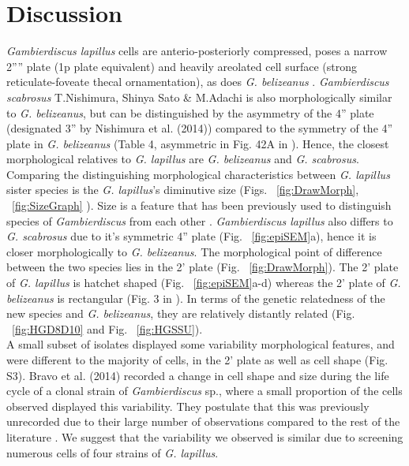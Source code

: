 \documentclass[12pt]{article}
\begin{document}
\newpage
\section{Discussion}
\emph{Gambierdiscus lapillus} cells are anterio-posteriorly compressed, poses a narrow 2'''' plate (1p plate equivalent) and heavily areolated cell surface (strong reticulate-foveate thecal ornamentation), as does \emph{G. belizeanus}  \citep{litaker2009taxonomy}.
 \emph{Gambierdiscus scabrosus} T.Nishimura, Shinya Sato \& M.Adachi is also morphologically similar to \emph{G. belizeanus}, but can be distinguished by the asymmetry of the 4'' plate (designated 3'' by Nishimura et al. (2014)) compared to the symmetry of the 4'' plate in \emph{G. belizeanus} (Table 4, asymmetric in Fig. 42A in \citep{hoppenrath2014marine}). 
 Hence, the closest morphological relatives to \emph{G. lapillus} are \emph{G. belizeanus} and \emph{G. scabrosus}. 
Comparing the distinguishing morphological characteristics between \emph{G. lapillus} sister species is the \textit{G. lapillus}'s diminutive size (Figs. ~\ref{fig:DrawMorph}, ~\ref{fig:SizeGraph} ).  
 Size is a feature that has been previously used to distinguish species of \emph{Gambierdiscus} from each other \citep{litaker2009taxonomy}. 
\emph{Gambierdiscus lapillus} also differs to \emph{G. scabrosus} due to it's symmetric 4'' plate (Fig. ~\ref{fig:epiSEM}a), hence it is closer morphologically to \emph{G. belizeanus}. 
The morphological point of difference between the two species lies in the 2' plate (Fig. ~\ref{fig:DrawMorph}).  
The 2' plate of \emph{G. lapillus} is hatchet shaped (Fig. ~\ref{fig:epiSEM}a-d) whereas the 2' plate of \emph{G. belizeanus} is rectangular (Fig. 3 in \citep{faust1995observation}). 
In terms of the genetic relatedness of the new species and \textit{G. belizeanus}, they are relatively distantly related (Fig. ~\ref{fig:HGD8D10} and Fig. ~\ref{fig:HGSSU}). \\
A small subset of isolates displayed some variability morphological features, and were different to the majority of cells, in the 2' plate as well as cell shape (Fig. S3).  
Bravo et al. (2014) recorded a change in cell shape and size during the life cycle of a clonal strain of \emph{Gambierdiscus} sp., where a small proportion of the cells observed displayed this variability. 
They postulate that this was previously unrecorded due to their large number of observations compared to the rest of the literature \citep{bravo2014cellular}. 
We suggest that the variability we observed is similar due to screening numerous cells of four strains of \emph{G. lapillus}. 
\end{document}
